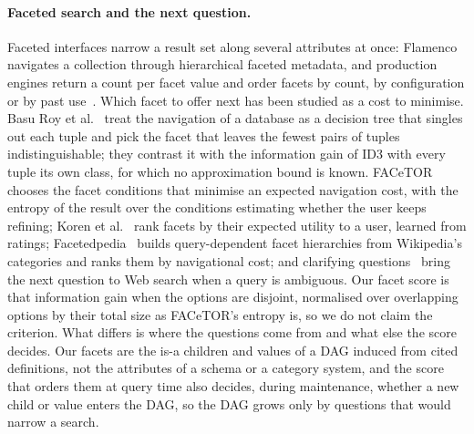 \paragraph{Faceted search and the next question.}
Faceted interfaces narrow a result set along several attributes at once:
Flamenco~\cite{yee2003faceted} navigates a collection through hierarchical
faceted metadata, and production engines return a count per facet value and
order facets by count, by configuration or by past
use~\cite{koren2008personalized,solrfaceting,algoliadynamicfacets}. Which
facet to offer next has been studied as a cost to minimise. Basu Roy et
al.~\cite{roy2008minimum} treat the navigation of a database as a decision
tree that singles out each tuple and pick the facet that leaves the fewest
pairs of tuples indistinguishable; they contrast it with the information gain
of ID3 with every tuple its own class, for which no approximation bound is
known. FACeTOR~\cite{kashyap2010facetor} chooses the facet conditions that
minimise an expected navigation cost, with the entropy of the result over the
conditions estimating whether the user keeps refining; Koren et
al.~\cite{koren2008personalized} rank facets by their expected utility to a
user, learned from ratings; Facetedpedia~\cite{li2010facetedpedia} builds
query-dependent facet hierarchies from Wikipedia's categories and ranks them
by navigational cost; and clarifying questions~\cite{zamani2020clarifying}
bring the next question to Web search when a query is ambiguous. Our facet
score is that information gain when the options are disjoint, normalised over
overlapping options by their total size as FACeTOR's entropy is, so we do not
claim the criterion. What differs is where the questions come from and what
else the score decides. Our facets are the is-a children and values of a DAG
induced from cited definitions, not the attributes of a schema or a category
system, and the score that orders them at query time also decides, during
maintenance, whether a new child or value enters the DAG, so the DAG grows
only by questions that would narrow a search.
